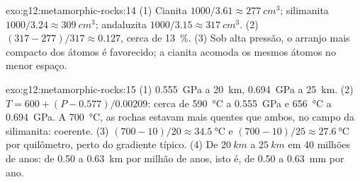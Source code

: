 \begin{solution}{exo:g12:metamorphic-rocks:14}
(1) Cianita $1000/3.61 \approx \qty{277}{cm^3}$; silimanita $1000/3.24
\approx \qty{309}{cm^3}$; andaluzita $1000/3.15 \approx \qty{317}{cm^3}$.
(2) $(317 - 277)/317 \approx 0.127$, cerca de \qty{13}{\percent}. (3) Sob alta
pressão, o arranjo mais compacto dos átomos é favorecido; a cianita
acomoda os mesmos átomos no menor espaço.
\end{solution}

\begin{solution}{exo:g12:metamorphic-rocks:15}
(1) \qty{0.555}{GPa} a \qty{20}{km}, \qty{0.694}{GPa} a \qty{25}{km}.
(2) $T = 600 + (P - 0.577)/0.00209$: cerca de \qty{590}{\celsius} a
\qty{0.555}{GPa} e \qty{656}{\celsius} a \qty{0.694}{GPa}. A
\qty{700}{\celsius}, as rochas estavam mais quentes que ambos, no campo da
silimanita: coerente. (3) $(700 - 10)/20 \approx \qty{34.5}{\celsius}$ e
$(700 - 10)/25 \approx \qty{27.6}{\celsius}$ por quilômetro, perto do
gradiente típico. (4) De $\qty{20}{km}$ a $\qty{25}{km}$ em 40 milhões de
anos: de 0.50 a \qty{0.63}{km} por milhão de anos, isto é, de 0.50 a
\qty{0.63}{mm} por ano.
\end{solution}

